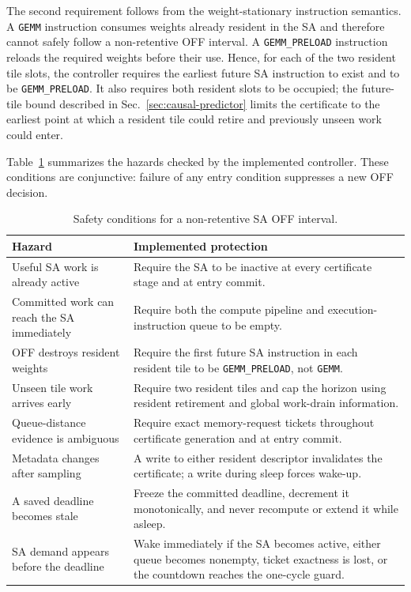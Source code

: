 The second requirement follows from the weight-stationary instruction
semantics. A \texttt{GEMM} instruction consumes weights already resident in
the SA and therefore cannot safely follow a non-retentive OFF interval. A
\texttt{GEMM\_PRELOAD} instruction reloads the required weights before their
use. Hence, for each of the two resident tile slots, the controller requires
the earliest future SA instruction to exist and to be
\texttt{GEMM\_PRELOAD}. It also requires both resident slots to be occupied;
the future-tile bound described in Sec.~\ref{sec:causal-predictor} limits the
certificate to the earliest point at which a resident tile could retire and
previously unseen work could enter.

Table~\ref{tab:nonretentive-safety} summarizes the hazards checked by the
implemented controller. These conditions are conjunctive: failure of any
entry condition suppresses a new OFF decision.

\begin{table}[t]
  \centering
  \caption{Safety conditions for a non-retentive SA OFF interval.}
  \label{tab:nonretentive-safety}
  \begin{tabular}{p{}p{}}
    \toprule
    Hazard & Implemented protection \\
    \midrule
    Useful SA work is already active
      & Require the SA to be inactive at every certificate stage and at
        entry commit. \\
    Committed work can reach the SA immediately
      & Require both the compute pipeline and execution-instruction queue to
        be empty. \\
    OFF destroys resident weights
      & Require the first future SA instruction in each resident tile to be
        \texttt{GEMM\_PRELOAD}, not \texttt{GEMM}. \\
    Unseen tile work arrives early
      & Require two resident tiles and cap the horizon using resident
        retirement and global work-drain information. \\
    Queue-distance evidence is ambiguous
      & Require exact memory-request tickets throughout certificate
        generation and at entry commit. \\
    Metadata changes after sampling
      & A write to either resident descriptor invalidates the certificate;
        a write during sleep forces wake-up. \\
    A saved deadline becomes stale
      & Freeze the committed deadline, decrement it monotonically, and never
        recompute or extend it while asleep. \\
    SA demand appears before the deadline
      & Wake immediately if the SA becomes active, either queue becomes
        nonempty, ticket exactness is lost, or the countdown reaches the
        one-cycle guard. \\
    \bottomrule
  \end{tabular}
\end{table}

